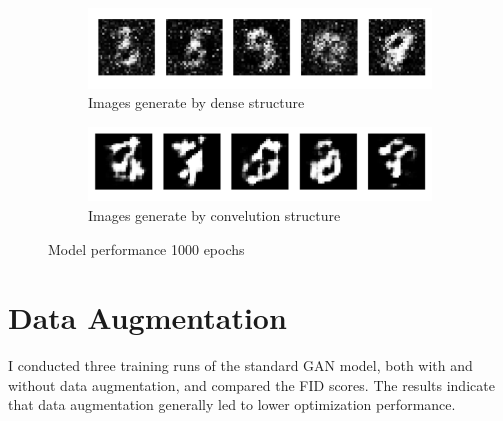\begin{figure}[H]
    \centering
    \begin{subfigure}[b]{\linewidth}
        \centering
        \includegraphics[width=0.7\linewidth]{./Images/generate_image_by_dense_layer.jpg}
        \caption{Images generate by dense structure}
        \label{fig:Dense}
    \end{subfigure}
    \vspace{0.05\linewidth} 
    \begin{subfigure}[b]{\linewidth}
        \centering
        \includegraphics[width=0.7\linewidth]{./Images/generate_image_by_Convelution_layer.jpg}
        \caption{Images generate by convelution structure}
        \label{fig:Conv2DTranspose}
    \end{subfigure}
    \caption{Model performance 1000 epochs}
    \label{fig:combined}
\end{figure}

\section*{Data Augmentation}

I conducted three training runs of the standard GAN model, both with and without data augmentation, 
and compared the FID scores. The results indicate that data augmentation generally led to lower optimization performance.


